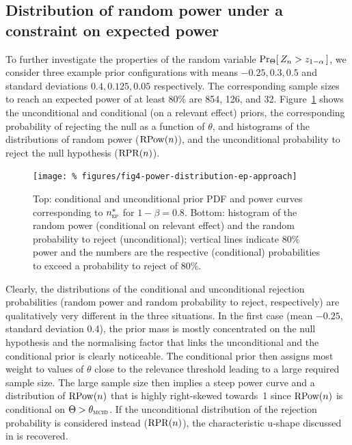 \documentclass{article}
\renewcommand{\Pr}{\operatorname{Pr}}
\begin{document}
\subsection{Distribution of random power under a constraint on expected power}

To further investigate the properties of the random variable $\Pr_{\Theta}[\,Z_n>\criticalvalue\,]$, we consider three example prior configurations with means $-0.25, 0.3, 0.5$ and standard deviations $0.4, 0.125, 0.05$ respectively.
The corresponding sample sizes to reach an expected power of at least 80\% are 854, 126, and 32.
Figure~\ref{fig:power-distribution} shows the unconditional and conditional (on a relevant effect) priors, the corresponding probability of rejecting the null as a function of $\theta$, and histograms of the distributions of random power ($\operatorname{RPow}({ n })$), and the unconditional probability to reject the null hypothesis ($\operatorname{RPR}(n)$).

\begin{figure}
    \centering
    \texttt{[image: \%
        figures/fig4-power-distribution-ep-approach]}
    \caption{%
        Top: conditional and unconditional prior PDF and power curves corresponding to $n_{\protect\scalebox{.5}{EP}}^*$ for $1-\beta=0.8$.
        Bottom: histogram of the random power (conditional on relevant effect) and the random probability to reject (unconditional); vertical lines indicate 80\% power and the numbers are the respective (conditional) probabilities to exceed a probability to reject of 80\%.
    }
    \label{fig:power-distribution}
\end{figure}

Clearly, the distributions of the conditional and unconditional rejection probabilities (random power and random probability to reject, respectively) are qualitatively very different in the three situations.
In the first case (mean $-0.25$, standard deviation 0.4), the prior mass is mostly concentrated on the null hypothesis and the normalising factor that links the unconditional and the conditional prior is clearly noticeable.
The conditional prior then assigns most weight to values of $\theta$ close to the relevance threshold leading to
a large required sample size.
The large sample size then implies a steep power curve and a distribution of $\operatorname{RPow}({ n })$ that is highly right-skewed towards~1 since $\operatorname{RPow}({ n })$ is conditional on $\Theta>\mcid$.
If the unconditional distribution of the rejection probability is considered instead ($\operatorname{RPR}(n)$), the characteristic u-shape discussed in \citet{rufibach_15} is recovered.
\end{document}
